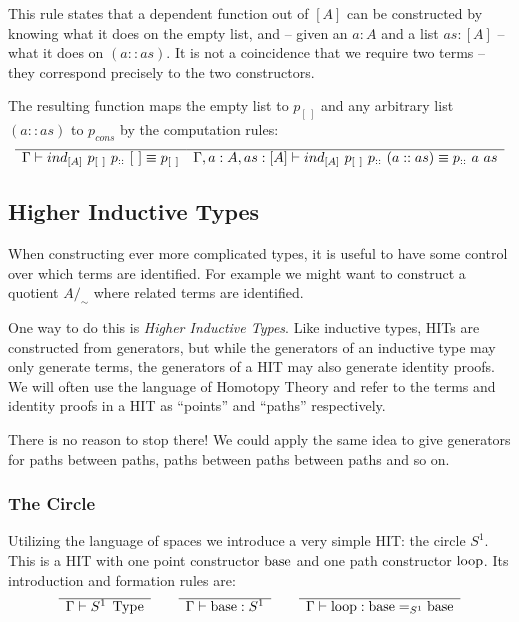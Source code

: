 This rule states that a dependent function out of $[A]$ can be constructed by
knowing what it does on the empty list, and -- given an $a:A$ and a list $as:[A]$ -- what
it does on $(a :: as)$. It is not a coincidence that we require two terms --
they correspond precisely to the two constructors.

The resulting function maps the empty list to $p_{[~]}$ and any arbitrary list
$(a::as)$ to $p_{cons}$ by the computation rules:
\[
  \begin{array}{c}
    \hline
    \Gamma \vdash ind_{[A]}~p_{[~]}~p_{::}~[~] \equiv p_{[~]}
  \end{array}
  \\
  \begin{array}{c}
    \hline
    \Gamma, a:A, as:[A] \vdash ind_{[A]}~p_{[~]}~p_{::}~(a::as) \equiv p_{::}~a~as
  \end{array}
\]

\subsection{Higher Inductive Types}

When constructing ever more complicated types, it is useful to have some
control over which terms are identified. For example we might want to construct
a quotient $A/_\sim$ where related terms are identified.

One way to do this is \emph{Higher Inductive Types}. Like inductive types, HITs
are constructed from generators, but while the generators of an inductive type
may only generate terms, the generators of a HIT may also generate identity
proofs. We will often use the language of Homotopy Theory and refer to the terms
and identity proofs in a HIT as ``points'' and ``paths'' respectively.

There is no reason to stop there! We could apply the same idea to give
generators for paths between paths, paths between paths between
paths and so on.

\subsubsection{The Circle}

Utilizing the language of spaces we introduce a very simple HIT: the circle
$S^1$. This is a HIT with one point constructor $\operatorname{base}$ and one path constructor
$\operatorname{loop}$. Its introduction and formation rules are:
\begin{equation*}
  \begin{array}[t]{c}
    \hline
    \Gamma \vdash S^1 \; \operatorname{Type}\\
  \end{array}
  \qquad
  \begin{array}[t]{c}
    \hline
    \Gamma \vdash \operatorname{base} : S^1\\
  \end{array}
  \qquad
  \begin{array}[t]{c}
    \hline
    \Gamma \vdash \operatorname{loop} : \operatorname{base} =_{S^1} \operatorname{base}
  \end{array}
\end{equation*}

